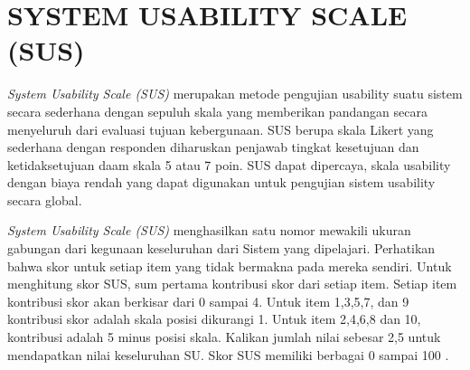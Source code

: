 \section{\uppercase{SYSTEM USABILITY SCALE (SUS)}}
\textit{System Usability Scale (SUS)} merupakan metode pengujian usability suatu sistem secara sederhana dengan sepuluh skala yang memberikan pandangan secara menyeluruh dari evaluasi tujuan kebergunaan. SUS berupa skala Likert yang sederhana dengan responden diharuskan penjawab tingkat kesetujuan dan ketidaksetujuan daam skala 5 atau 7 poin. SUS dapat dipercaya, skala usability dengan biaya rendah yang dapat digunakan untuk pengujian sistem usability secara global.

\par \textit{System Usability Scale (SUS)} menghasilkan satu nomor mewakili ukuran gabungan dari kegunaan keseluruhan dari Sistem yang dipelajari. Perhatikan bahwa skor untuk setiap item yang tidak bermakna pada mereka sendiri. Untuk menghitung skor SUS, sum pertama kontribusi skor dari setiap item. Setiap item kontribusi skor akan berkisar dari 0 sampai 4. Untuk item 1,3,5,7, dan 9 kontribusi skor adalah skala posisi dikurangi 1. Untuk item 2,4,6,8 dan 10, kontribusi adalah 5 minus posisi skala. Kalikan jumlah nilai sebesar 2,5 untuk mendapatkan nilai keseluruhan SU. Skor SUS memiliki berbagai 0 sampai 100 \citep{brooke2007}.




\fancyhf{} 
\fancyfoot[R]{\thepage}

